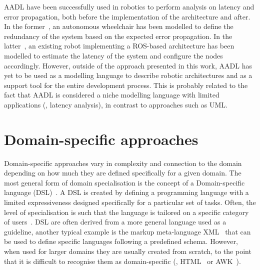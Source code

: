 AADL have been successfully used in robotics to perform analysis on latency and error propagation, both before the implementation of the architecture and after. In the former~\cite{biggs2014modelling}, an autonomous wheelchair has been modelled to define the redundancy of the system based on the expected error propagation. In the latter~\cite{larsen2016modelling}, an existing robot implementing a ROS-based architecture has been modelled to estimate the latency of the system and configure the nodes accordingly. However, outside of the approach presented in this work, AADL has yet to be used as a modelling language to describe robotic architectures and as a support tool for the entire development process. This is probably related to the fact that AADL is considered a niche modelling language with limited applications (\eg, latency analysis), in contrast to approaches such as UML.

\section{Domain-specific approaches}
Domain-specific approaches vary in complexity and connection to the domain depending on how much they are defined specifically for a given domain. The most general form of domain specialisation is the concept of a Domain-specific language (DSL)~\cite{fowler2010domain}.  A DSL is created by defining a programming language with a limited expressiveness designed specifically for a particular set of tasks. Often, the level of specialisation is such that the language is tailored on a specific category of users~\cite{voelter2013dsl}. DSL are often derived from a more general language used as a guideline, another typical example is the markup meta-language XML~\cite{harold1998xml} that can be used to define specific languages following a predefined schema. However, when used for larger domains they are usually created from scratch, to the point that it is difficult to recognise them as domain-specific (\eg, HTML~\cite{graham1995html} or AWK~\cite{dougherty1997sed}).

